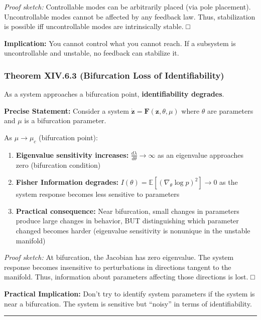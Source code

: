 \documentclass[
]{article}
\begin{document}
\emph{Proof sketch:} Controllable modes can be arbitrarily placed (via
pole placement). Uncontrollable modes cannot be affected by any feedback
law. Thus, stabilization is possible iff uncontrollable modes are
intrinsically stable. □

\textbf{Implication:} You cannot control what you cannot reach. If a
subsystem is uncontrollable and unstable, no feedback can stabilize it.

\subsubsection{Theorem XIV.6.3 (Bifurcation Loss of
Identifiability)}\label{theorem-xiv.6.3-bifurcation-loss-of-identifiability}

As a system approaches a bifurcation point, \textbf{identifiability
degrades}.

\textbf{Precise Statement:} Consider a system
\(\dot{\mathbf{z}} = \mathbf{F}(\mathbf{z}, \theta, \mu)\) where
\(\theta\) are parameters and \(\mu\) is a bifurcation parameter.

As \(\mu \to \mu_c\) (bifurcation point):

\begin{enumerate}
\def\labelenumi{\arabic{enumi}.}
\item
  \textbf{Eigenvalue sensitivity increases:}
  \(\frac{d\lambda}{d\theta} \to \infty\) as an eigenvalue approaches
  zero (bifurcation condition)
\item
  \textbf{Fisher Information degrades:}
  \(I(\theta) = \mathbb{E}[(\nabla_\theta \log p)^2] \to 0\) as the
  system response becomes less sensitive to parameters
\item
  \textbf{Practical consequence:} Near bifurcation, small changes in
  parameters produce large changes in behavior, BUT distinguishing which
  parameter changed becomes harder (eigenvalue sensitivity is nonunique
  in the unstable manifold)
\end{enumerate}

\emph{Proof sketch:} At bifurcation, the Jacobian has zero eigenvalue.
The system response becomes insensitive to perturbations in directions
tangent to the manifold. Thus, information about parameters affecting
those directions is lost. □

\textbf{Practical Implication:} Don't try to identify system parameters
if the system is near a bifurcation. The system is sensitive but
``noisy'' in terms of identifiability.

\begin{center}\rule{0.5\linewidth}{0.5pt}\end{center}
\end{document}
